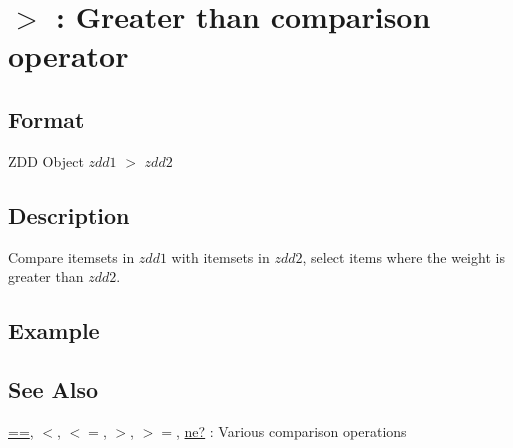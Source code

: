 
\section{$>$ : Greater than comparison operator\label{sect:gt}}
\subsection*{Format}
ZDD Object  $zdd1$ $>$ $zdd2$

\subsection*{Description}
Compare itemsets in $zdd1$ with itemsets in $zdd2$, select items where the weight is greater than $zdd2$. 


\subsection*{Example}


\subsection*{See Also}
\hyperref[sect:eq]{==},
\hyperref[sect:lt]{$<$},
\hyperref[sect:le]{$<=$},
\hyperref[sect:gt]{$>$},
\hyperref[sect:ge]{$>=$},
\hyperref[sect:ne]{ne?} : Various comparison operations

